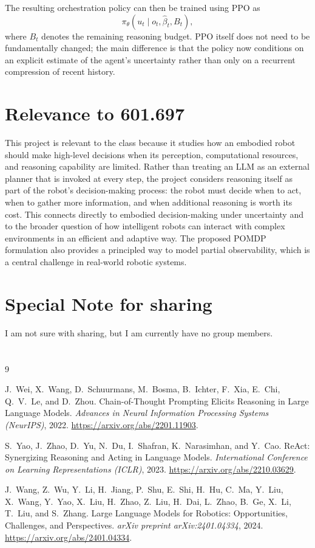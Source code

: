 \documentclass[11pt]{article}
\begin{document}
The resulting orchestration policy can then be trained using PPO as
\[
\pi_{\theta}
\left(
u_t
\mid
o_t,\hat{\beta}_t,B_t
\right),
\]
where $B_t$ denotes the remaining reasoning budget. PPO itself does not need to be fundamentally changed; the main difference is that the policy now conditions on an explicit estimate of the agent's uncertainty rather than only on a recurrent compression of recent history.

\section{Relevance to 601.697}
This project is relevant to the class because it studies how an embodied robot should make high-level decisions when its perception, computational resources, and reasoning capability are limited. Rather than treating an LLM as an external planner that is invoked at every step, the project considers reasoning itself as part of the robot's decision-making process: the robot must decide when to act, when to gather more information, and when additional reasoning is worth its cost. This connects directly to embodied decision-making under uncertainty and to the broader question of how intelligent robots can interact with complex environments in an efficient and adaptive way. The proposed POMDP formulation also provides a principled way to model partial observability, which is a central challenge in real-world robotic systems.

\section{Special Note for sharing}
I am not sure with sharing, but I am currently have no group members.

\section{}

\begin{thebibliography}{9}
\small

J.~Wei, X.~Wang, D.~Schuurmans, M.~Bosma, B.~Ichter, F.~Xia, E.~Chi, Q.~V.~Le, and D.~Zhou.
\newblock Chain-of-Thought Prompting Elicits Reasoning in Large Language Models.
\newblock \emph{Advances in Neural Information Processing Systems (NeurIPS)}, 2022.
\newblock \url{https://arxiv.org/abs/2201.11903}.

S.~Yao, J.~Zhao, D.~Yu, N.~Du, I.~Shafran, K.~Narasimhan, and Y.~Cao.
\newblock ReAct: Synergizing Reasoning and Acting in Language Models.
\newblock \emph{International Conference on Learning Representations (ICLR)}, 2023.
\newblock \url{https://arxiv.org/abs/2210.03629}.

J.~Wang, Z.~Wu, Y.~Li, H.~Jiang, P.~Shu, E.~Shi, H.~Hu, C.~Ma, Y.~Liu, X.~Wang, Y.~Yao, X.~Liu, H.~Zhao, Z.~Liu, H.~Dai, L.~Zhao, B.~Ge, X.~Li, T.~Liu, and S.~Zhang.
\newblock Large Language Models for Robotics: Opportunities, Challenges, and Perspectives.
\newblock \emph{arXiv preprint arXiv:2401.04334}, 2024.
\newblock \url{https://arxiv.org/abs/2401.04334}.

\end{thebibliography}
\end{document}
